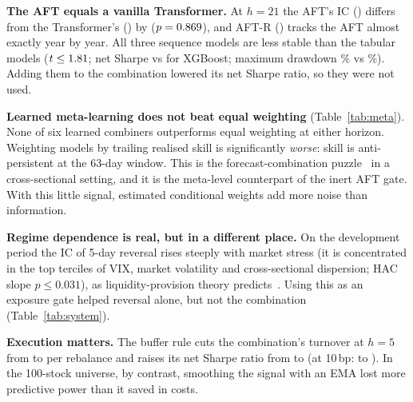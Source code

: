 \textbf{The AFT equals a vanilla Transformer.} At $h=21$ the AFT's IC (\stAftIc) differs from the Transformer's (\stTrfIc) by \stAftVsTrfD{} ($p=0.869$), and AFT-R (\stAftrIc) tracks the AFT almost exactly year by year. All three sequence models are less stable than the tabular models ($t\le1.81$; net Sharpe \stAftSr{} vs \stXgbSr{} for XGBoost; maximum drawdown \stAftMdd\% vs \stXgbMdd\%). Adding them to the combination lowered its net Sharpe ratio, so they were not used.

\begin{table}[t]
\centering
\caption{Learned meta-learners vs equal-weight rank combination (eight inputs: XGBoost, ridge, MLP and five factors), meta out-of-sample 2017--2022, S\&P~500. $p$: Newey--West test of the daily IC difference against equal weighting.}
\label{tab:meta}
\scriptsize
\setlength{\tabcolsep}{3pt}
\end{table}

\textbf{Learned meta-learning does not beat equal weighting} (Table~\ref{tab:meta}). None of six learned combiners outperforms equal weighting at either horizon. Weighting models by trailing realised skill is significantly \emph{worse}: skill is anti-persistent at the 63-day window. This is the forecast-combination puzzle~\cite{rapach2010} in a cross-sectional setting, and it is the meta-level counterpart of the inert AFT gate. With this little signal, estimated conditional weights add more noise than information.

\textbf{Regime dependence is real, but in a different place.} On the development period the IC of 5-day reversal rises steeply with market stress (it is concentrated in the top terciles of VIX, market volatility and cross-sectional dispersion; HAC slope $p\le0.031$), as liquidity-provision theory predicts~\cite{nagel2012}. Using this as an exposure gate helped reversal alone, but not the combination (Table~\ref{tab:system}).

\textbf{Execution matters.} The buffer rule cuts the combination's turnover at $h=5$ from \bufQTurn{} to \bufBTurn{} per rebalance and raises its net Sharpe ratio from \bufQSr{} to \bufBSr{} (at 10\,bp: \bufQSrt{} to \bufBSrt). In the 100-stock universe, by contrast, smoothing the signal with an EMA lost more predictive power than it saved in costs.

